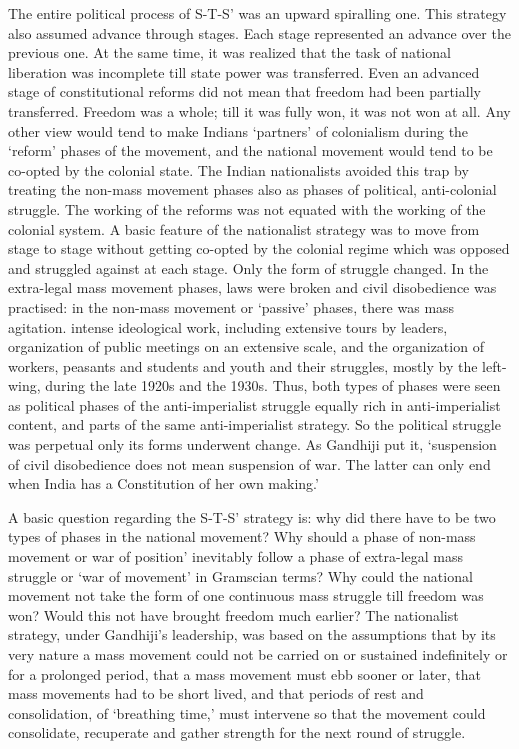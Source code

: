 The entire political process of S-T-S' was an upward spiralling one. This strategy also assumed advance through stages. Each stage represented an advance over the previous one. At the same time, it was realized that the task of national liberation was incomplete till state power was transferred. Even an advanced stage of constitutional reforms did not mean that freedom had been partially transferred. Freedom was a whole; till it was fully won, it was not won at all. Any other view would tend to make Indians `partners' of colonialism during the `reform' phases of the movement, and the national movement would tend to be co-opted by the colonial state. The Indian nationalists avoided this trap by treating the non-mass movement phases also as phases of political, anti-colonial struggle. The working of the reforms was not equated with the working of the colonial system. A basic feature of the nationalist strategy was to move from stage to stage without getting co-opted by the colonial regime which was opposed and struggled against at each stage. Only the form of struggle changed. In the extra-legal mass movement phases, laws were broken and civil disobedience was practised: in the non-mass movement or `passive' phases, there was mass agitation. intense ideological work, including extensive tours by leaders, organization of public meetings on an extensive scale, and the organization of workers, peasants and students and youth and their struggles, mostly by the left-wing, during the late 1920s and the 1930s. Thus, both types of phases were seen as political phases of the anti-imperialist struggle equally rich in anti-imperialist content, and parts of the same anti-imperialist strategy. So the political struggle was perpetual only its forms underwent change. As Gandhiji put it, `suspension of civil disobedience does not mean suspension of war. The latter can only end when India has a Constitution of her own making.' 

A basic question regarding the S-T-S' strategy is: why did there have to be two types of phases in the national movement? Why should a phase of non-mass movement or war of position' inevitably follow a phase of extra-legal mass struggle or `war of movement' in Gramscian terms? Why could the national movement not take the form of one continuous mass struggle till freedom was won? Would this not have brought freedom much earlier? The nationalist strategy, under Gandhiji's leadership, was based on the assumptions that by its very nature a mass movement could not be carried on or sustained indefinitely or for a prolonged period, that a mass movement must ebb sooner or later, that mass movements had to be short lived, and that periods of rest and consolidation, of `breathing time,' must intervene so that the movement could consolidate, recuperate and gather strength for the next round of struggle. 

